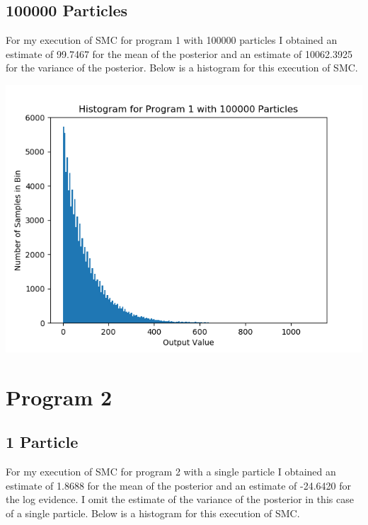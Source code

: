 \documentclass[11pt]{article}
\theoremstyle{definition}
\begin{document}
\subsection{100000 Particles}

For my execution of SMC for program 1 with 100000 particles I obtained an estimate of 99.7467 for the mean of the posterior and an estimate of  10062.3925 for the variance of the posterior. Below is a histogram for this execution of SMC.

\begin{center}
\includegraphics[scale=0.5]{../plots/P1NP100000.png}
\end{center}

\section{Program 2}


\subsection{1 Particle}

For my execution of SMC for program 2 with a single particle I obtained an estimate of 1.8688 for the mean of the posterior and an estimate of -24.6420 for the log evidence. I omit the estimate of the variance of the posterior in this case of a single particle. Below is a histogram for this execution of SMC.
\end{document}
